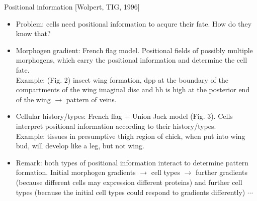 \documentclass{report}
\begin{document}
Positional information [Wolpert, TIG, 1996]
\begin{itemize}
\item Problem: cells need positional information to acqure their fate. How do they know that? 

\item Morphogen gradient: French flag model. Positional fields of possibly multiple morphogens, which carry the positional information and determine the cell fate. \\
Example: (Fig. 2) insect wing formation, dpp at the boundary of the compartments of the wing imaginal disc and hh is high at the posterior end of the wing $\rightarrow$ pattern of veins. 

\item Cellular history/types: French flag + Union Jack model (Fig. 3). Cells interpret positional information according to their history/types. \\
Example: tissues in presumptive thigh region of chick, when put into wing bud, will develop like a leg, but not wing. 

\item Remark: both types of positional information interact to determine pattern formation. Initial morphogen gradients $\rightarrow$ cell types $\rightarrow$ further gradients (because different cells may expression different proteins) and further cell types (because the initial cell types could respond to gradients differently) $\cdots$
\end{itemize}
\end{document}
